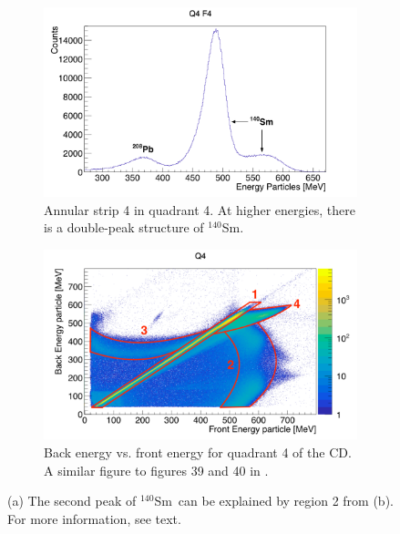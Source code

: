 \documentclass[twoside,english]{uiofysmaster/uiofysmaster}
\newcommand{\Sm}{$^{140}$Sm} %
\begin{document}
\begin{figure}[ht]
	\centering
	\begin{subfigure}{\textwidth}
		\centering
		\includegraphics[width=\textwidth]{../Plots/plotting/TB_Q4_F4_cal.png}
		\caption{Annular strip 4 in quadrant 4. At higher energies, there is a double-peak structure of \Sm.}
		\label{fig:bump}
	\end{subfigure}
	\begin{subfigure}{\textwidth}
		\centering
		\includegraphics[width=\textwidth]{../Plots/plotting/E_f_b_Q4-user-drawing.png}
		\caption{Back energy vs. front energy for quadrant 4 of the CD. A similar figure to figures 39 and 40 in \cite{Rosiak}.}
	\label{fig:EFBQ4}
	\end{subfigure}
	\caption{(a) The second peak of \Sm\ can be explained by region 2 from (b). For more information, see text.}
	\label{fig:FBE}
\end{figure}
\end{document}
